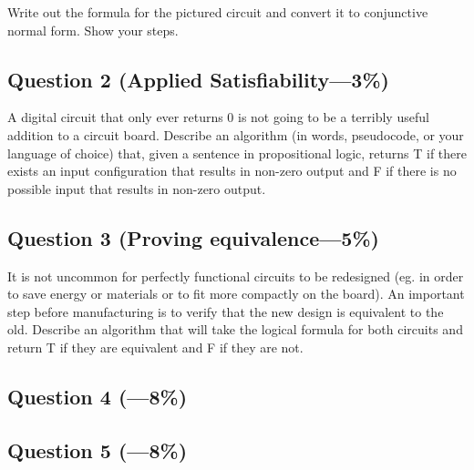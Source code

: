 \documentclass[12pt]{article}
\begin{document}
Write out the formula for the pictured circuit and convert it to conjunctive normal form. Show your steps.

\subsection*{Question 2 \rm(Applied Satisfiability---3\%)}
A digital circuit that only ever returns 0 is not going to be a terribly useful addition to a circuit board. Describe an algorithm (in words, pseudocode, or your language of choice) that, given a sentence in propositional logic, returns T if there exists an input configuration that results in non-zero output and F if there is no possible input that results in non-zero output.

\subsection*{Question 3 \rm(Proving equivalence---5\%)}
It is not uncommon for perfectly functional circuits to be redesigned (eg. in order to save energy or materials or to fit more compactly on the board). An important step before manufacturing is to verify that the new design is equivalent to the old. Describe an algorithm that will take the logical formula for both circuits and return T if they are equivalent and F if they are not.

\subsection*{Question 4 \rm(---8\%)}

\subsection*{Question 5 \rm(---8\%)}
\end{document}
